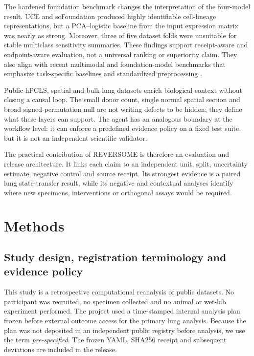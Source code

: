 \documentclass[11pt]{article}
\begin{document}
The hardened foundation benchmark changes the interpretation of the four-model result. UCE and scFoundation produced highly identifiable cell-lineage representations, but a PCA--logistic baseline from the input expression matrix was nearly as strong. Moreover, three of five dataset folds were unsuitable for stable multiclass sensitivity summaries. These findings support receipt-aware and endpoint-aware evaluation, not a universal ranking or superiority claim. They also align with recent multimodal and foundation-model benchmarks that emphasize task-specific baselines and standardized preprocessing \cite{Fu2025,Wang2026}.

Public hPCLS, spatial and bulk-lung datasets enrich biological context without closing a causal loop. The small donor count, single normal spatial section and broad signed-permutation null are not writing defects to be hidden; they define what these layers can support. The agent has an analogous boundary at the workflow level: it can enforce a predefined evidence policy on a fixed test suite, but it is not an independent scientific validator.

The practical contribution of REVERSOME is therefore an evaluation and release architecture. It links each claim to an independent unit, split, uncertainty estimate, negative control and source receipt. Its strongest evidence is a paired lung state-transfer result, while its negative and contextual analyses identify where new specimens, interventions or orthogonal assays would be required.

\section*{Methods}

\subsection*{Study design, registration terminology and evidence policy}

This study is a retrospective computational reanalysis of public datasets. No participant was recruited, no specimen collected and no animal or wet-lab experiment performed. The project used a time-stamped internal analysis plan frozen before external outcome access for the primary lung analysis. Because the plan was not deposited in an independent public registry before analysis, we use the term \emph{pre-specified}. The frozen YAML, SHA256 receipt and subsequent deviations are included in the release.
\end{document}
